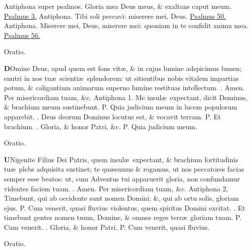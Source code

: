 \documentclass[letter,11pt]{book}
\makeatletter
\DeclareRobustCommand{\Vbar}{\vers@resp{-0.1em}{V}}
\DeclareRobustCommand{\Rbar}{\vers@resp{0pt}{R}}
\newcommand{\vers@resp@sym}{\raisebox{0.2ex}{\rotatebox[origin=c]{-20}{$\m@th\rceil$}}}
\newcommand{\vers@resp}[2]{%
  {\ooalign{\hidewidth\kern#1\vers@resp@sym\hidewidth\cr#2\cr}}%
}%
\def\P{\color{Red} P. \color{black}}
\def\V{\color{Red} \Vbar . \color{black}}
\def\R{\color{Red} \Rbar . \color{black}}
\makeatother
\begin{document}
\begin{multicols}{2}
\newline \color{Red} Antiphona super psalmos. \color{black} Gloria mea Deus meus, \& exaltans caput meum. \color{Red} \hyperlink{ps3}{Psalmus 3.} \color{black}
\newline \color{Red} Antiphona. \color{black} Tibi soli peccavi: miserere mei, Deus. \color{Red} \hyperlink{ps50}{Psalmus 50.} \color{black}
\newline \color{Red} Antiphona. \color{black} Miserere mei, Deus, miserere mei: quoniam in te confidit anima mea. \color{Red} \hyperlink{ps56}{Psalmus 56.} \color{black}
\vspace{-.5em} \begin{center} \color{Red} Oratio. \color{black} \end{center} \vspace{-.5em}
\lettrine[lines=2]{\bfseries \color{Red} D}{}Omine Deus, apud quem est fons vit\ae , \& in cujus lumine adspicimus lumen; enutri in nos tu\ae \ scienti\ae \ splendorem: ut sitientibus nobis vitalem impartias potum, \& caligantium animarum superno lumine restituas intellectum. \R Amen. Per misericordiam tuam, \&c.
\newline \color{Red} Antiphona 1. \color{black} Me insul\ae \ expectant, dicit Dominus, \& brachium meum sustinebunt. \P Quia judicium meum in lucem populorum apparebit. \V Deus deorum Dominus locutus est, \& vocavit terram. \P Et brachium. \V Gloria, \& honor Patri, \&c. \P Quia judicium meum.
\vspace{-.5em} \begin{center} \color{Red} Oratio. \color{black} \end{center} \vspace{-.5em}
\lettrine[lines=2]{\bfseries \color{Red} U}{}Nigenite Filius Dei Patris, quem insul\ae \ expectant, \& brachium fortitudinis tu\ae \ plebs adquisita sustinet; te qu\ae sumus \& rogamus, ut nos peccatores facias semper esse beatos: ut, cum Adventus tui apparuerit gloria, non confundamur videntes faciem tuam. \R Amen. Per misericordiam tuam, \&c.
\newline \color{Red} Antiphona 2. \color{black} Timebunt, qui ab occidente sunt nomen Domini; \&, qui ab ortu solis, gloriam ejus. \P Cum venerit, quasi fluvius violentus, quem spiritus Domini excitat. \V Et timebunt gentes nomen tuum, Domine, \& omnes reges terr\ae \ gloriam tuam. \P Cum venerit. \V Gloria, \& honor Patri. \P Cum venerit, quasi fluvius.
\vspace{-.5em} \begin{center} \color{Red} Oratio. \color{black} \end{center} \vspace{-.5em}

\end{multicols}
\end{document}
